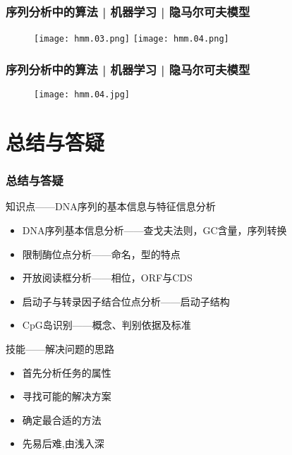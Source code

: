 \begin{frame}
  \frametitle{序列分析中的算法 | 机器学习 | 隐马尔可夫模型}
  \begin{figure}
    \centering
    \texttt{[image: hmm.03.png]}
    \texttt{[image: hmm.04.png]}
  \end{figure}
\end{frame}

\begin{frame}
  \frametitle{序列分析中的算法 | 机器学习 | 隐马尔可夫模型}
  \begin{figure}
    \centering
    \texttt{[image: hmm.04.jpg]}
  \end{figure}
\end{frame}

\section{总结与答疑}
\begin{frame}
  \frametitle{总结与答疑}
  \begin{block}{知识点——DNA序列的基本信息与特征信息分析}
    \begin{itemize}
      \item DNA序列基本信息分析——查戈夫法则，GC含量，序列转换
      \item 限制酶位点分析——命名，型的特点
      \item 开放阅读框分析——相位，ORF与CDS
      \item 启动子与转录因子结合位点分析——启动子结构
      \item CpG岛识别——概念、判别依据及标准
    \end{itemize}
  \end{block}
  \begin{block}{技能——解决问题的思路}
    \begin{itemize}
      \item 首先分析任务的属性
      \item 寻找可能的解决方案
      \item 确定最合适的方法
      \item 先易后难,由浅入深
    \end{itemize}
  \end{block}
\end{frame}
